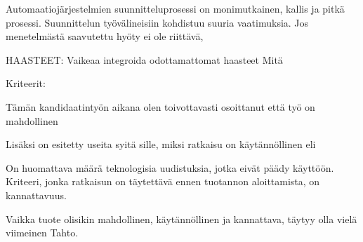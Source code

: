 \documentclass[finnish,12pt]{article}
\begin{document}
Automaatiojärjestelmien suunnitteluprosessi on monimutkainen, kallis ja pitkä prosessi.
Suunnittelun työvälineisiin kohdistuu suuria vaatimuksia.
Jos menetelmästä saavutettu hyöty ei ole riittävä,

HAASTEET:
Vaikeaa integroida
odottamattomat haasteet
Mitä

Kriteerit:

Tämän kandidaatintyön aikana olen toivottavasti osoittanut että työ on mahdollinen

Lisäksi on esitetty useita syitä sille, miksi ratkaisu on käytännöllinen eli 

On huomattava määrä teknologisia uudistuksia, jotka eivät päädy käyttöön.
Kriteeri, jonka ratkaisun on täytettävä ennen tuotannon aloittamista, on kannattavuus.

Vaikka tuote olisikin mahdollinen, käytännöllinen ja kannattava, täytyy olla vielä viimeinen
Tahto.

\clearpage
{}


\end{document}
